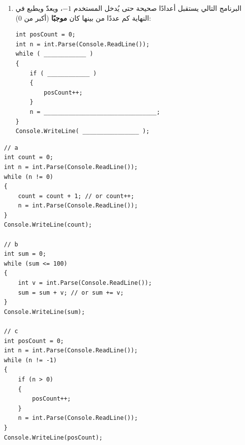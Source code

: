 \documentclass[14pt]{extarticle}
\begin{document}
\begin{enumerate}[resume, itemsep=2em]
\begin{enumerate}
    \item البرنامج التالي يستقبل أعدادًا صحيحة حتى يُدخل المستخدم $-1$، ويعدّ ويطبع في النهاية كم عددًا من بينها كان \textbf{موجبًا} (أكبر من $0$):
\begin{boxCode}
\begin{english}
\begin{verbatim}
int posCount = 0;
int n = int.Parse(Console.ReadLine());
while ( ____________ )
{
    if ( ____________ )
    {
        posCount++;
    }
    n = ________________________________;
}
Console.WriteLine( ________________ );
\end{verbatim}
\end{english}
\end{boxCode}
\end{enumerate}
\ifwithsols
\begin{boxSolution}
\begin{english}
\begin{verbatim}
// a
int count = 0;
int n = int.Parse(Console.ReadLine());
while (n != 0)
{
    count = count + 1; // or count++;
    n = int.Parse(Console.ReadLine());
}
Console.WriteLine(count);

// b
int sum = 0;
while (sum <= 100)
{
    int v = int.Parse(Console.ReadLine());
    sum = sum + v; // or sum += v;
}
Console.WriteLine(sum);

// c
int posCount = 0;
int n = int.Parse(Console.ReadLine());
while (n != -1)
{
    if (n > 0)
    {
        posCount++;
    }
    n = int.Parse(Console.ReadLine());
}
Console.WriteLine(posCount);
\end{verbatim}
\end{english}
\end{boxSolution}
\fi
\filbreak

\end{enumerate}
\end{document}
